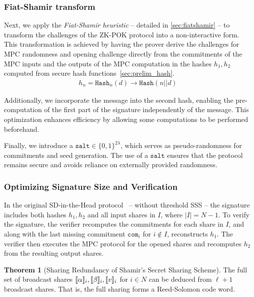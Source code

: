 \documentclass[11pt]{report}
\theoremstyle{definition}
\newtheorem{theorem}{Theorem}[section]
\theoremstyle{plain}
\begin{document}
\subsubsection{Fiat-Shamir transform}
Next, we apply the \textit{Fiat-Shamir heuristic} -- detailed in \autoref{sec:fiatshamir} -- to transform the challenges of the ZK-POK protocol into a non-interactive form. This transformation is achieved by having the prover derive the challenges for MPC randomness and opening challenge directly from the commitments of the MPC inputs and the outputs of the MPC computation in the hashes $h_1, h_2$ computed from secure hash functions~\autoref{sec:prelim_hash}.
\begin{align}
  h_n = \texttt{Hash}_n(d) \rightarrow \texttt{Hash}(n || d)\label{eq:fiatshamirhash}
\end{align}

Additionally, we incorporate the message into the second hash, enabling the pre-computation of the first part of the signature independently of the message. This optimization enhances efficiency by allowing some computations to be performed beforehand.

Finally, we introduce a $\texttt{salt} \in \{0,1\}^{2\lambda}$, which serves as pseudo-randomness for commitments and seed generation. The use of a $\texttt{salt}$ ensures that the protocol remains secure and avoids reliance on externally provided randomness.

\subsubsection{Optimizing Signature Size and Verification}\label{sec:mpc_thresh_tweak}
In the original SD-in-the-Head protocol~\cite[Figure 1]{aguilarsyndrome11} -- without threshold SSS -- the signature includes both hashes $h_1, h_2$ and all input shares in $I$, where $|I| = N - 1$.
To verify the signature, the verifier recomputes the commitments for each share in $I$, and along with the last missing commitment $\texttt{com}_i$ for $i \notin I$, reconstructs $h_1$. The verifier then executes the MPC protocol for the opened shares and recomputes $h_2$ from the resulting output shares.

\begin{theorem}[Sharing Redundancy of Shamir's Secret Sharing Scheme]
  The full set of broadcast shares $\llbracket \alpha \rrbracket_i, \llbracket \beta \rrbracket_i, \llbracket v \rrbracket_i$ for $i \in N$ can be deduced from $\ell + 1$ broadcast shares. That is, the full sharing forms a Reed-Solomon code word.
\end{theorem}
\end{document}
